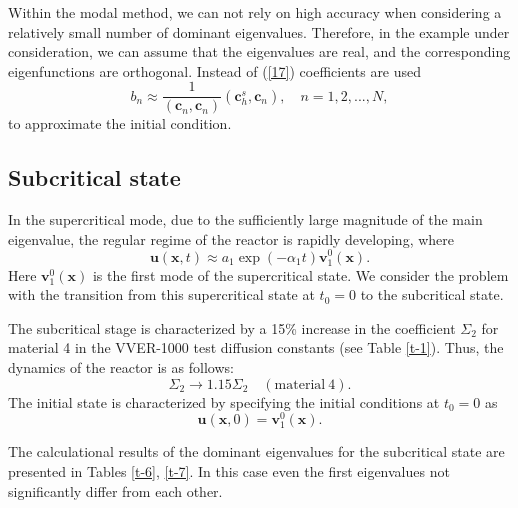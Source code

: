 \documentclass[authoryear]{elsarticle}
\begin{document}
Within the modal method, we can not rely on high accuracy when considering a relatively small number of dominant eigenvalues. Therefore, in the example under consideration, we can assume that the eigenvalues are real, and the corresponding eigenfunctions are orthogonal. Instead of (\ref{17}) coefficients are used 
\begin{equation}\label{24}
 b_n \approx  \frac{1}{(\bm c_n, \bm c_n)} (\bm c_h^s, \bm c_n),
 \quad n = 1,2, ..., N ,
\end{equation}
to approximate the initial condition.

\subsection{Subcritical state} 

In the supercritical mode, due to the sufficiently large magnitude of the main eigenvalue, the regular regime of the reactor is rapidly developing, where 
\[
 \bm u (\bm x, t) \approx a_1 \exp(-\alpha_1 t) \bm v_1^0 (\bm x) .
\] 
Here  $\bm v_1^0 (\bm x)$ is the first mode of the supercritical state. We consider the problem with the transition from this supercritical state at  $t_0 = 0$  to the subcritical state.

The subcritical stage is characterized by a 15\% increase in the coefficient  
$\Sigma_2$ for material 4 in the VVER-1000 test diffusion constants (see Table  \ref{t-1}). 
Thus, the dynamics of the reactor is as follows: 
\[
 \Sigma_2 \longrightarrow 1.15 \Sigma_2 \quad (\mathrm{material} \ 4).
\] 
The initial state is characterized by specifying the initial conditions at $t_0 = 0$ as
\begin{equation}\label{25}
 \bm u (\bm x, 0) = \bm v_1^0 (\bm x) . 
\end{equation} 

The calculational results of  the dominant eigenvalues for the subcritical state are presented in Tables \ref{t-6}, \ref{t-7}. In this case even the first eigenvalues not significantly differ from each other. 
\end{document}
